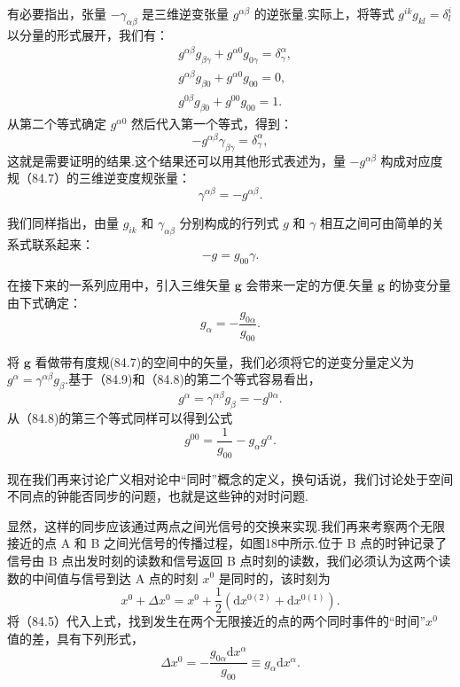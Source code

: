 有必要指出，张量 $-\gamma_{\alpha\beta}$ 是三维逆变张量 $g^{\alpha\beta}$ 的逆张量.实际上，将等式 $g^{ik}g_{kl}=\delta^i_l$ 以分量的形式展开，我们有：
\begin{equation}
\begin{aligned}
  &g^{\alpha\beta}g_{\beta\gamma}+g^{\alpha 0}g_{0\gamma}=\delta^{\alpha}_{\gamma},\\
  &g^{\alpha\beta}g_{\beta 0}+g^{\alpha 0}g_{00}=0,\\
  &g^{0\beta}g_{\beta 0}+g^{00}g_{00}=1.
\end{aligned}
\end{equation}
从第二个等式确定 $g^{\alpha 0}$ 然后代入第一个等式，得到：
\begin{equation*}
  -g^{\alpha\beta}\gamma_{\beta\gamma}=\delta^{\alpha}_{\gamma},
\end{equation*}
这就是需要证明的结果.这个结果还可以用其他形式表述为，量 $-g^{\alpha\beta}$ 构成对应度规（84.7）的三维逆变度规张量：
\begin{equation}
  \gamma^{\alpha\beta}=-g^{\alpha\beta}.
\end{equation}

我们同样指出，由量 $g_{ik}$ 和 $\gamma_{\alpha\beta}$ 分别构成的行列式 $g$ 和 $\gamma$ 相互之间可由简单的关系式联系起来：
\begin{equation}
  -g=g_{00}\gamma.
\end{equation}

在接下来的一系列应用中，引入三维矢量 $\boldsymbol{g}$ 会带来一定的方便.矢量 $\boldsymbol{g}$ 的协变分量由下式确定：
\begin{equation}
  g_{\alpha}=-\frac{g_{0\alpha}}{g_{00}}.
\end{equation}

将 $\boldsymbol{g}$ 看做带有度规(84.7)的空间中的矢量，我们必须将它的逆变分量定义为 $g^{\alpha}=\gamma^{\alpha\beta}g_{\beta}$.基于（84.9)和（84.8)的第二个等式容易看出，
\begin{equation}
  g^{\alpha}=\gamma^{\alpha\beta}g_{\beta}=-g^{0\alpha}.
\end{equation}
从（84.8)的第三个等式同样可以得到公式
\begin{equation}
  g^{00}=\frac{1}{g_{00}}-g_{\alpha}g^{\alpha}.
\end{equation}

现在我们再来讨论广义相对论中“同时”概念的定义，换句话说，我们讨论处于空间不同点的钟能否同步的问题，也就是这些钟的对时问题.

显然，这样的同步应该通过两点之间光信号的交换来实现.我们再来考察两个无限接近的点 A 和 B 之间光信号的传播过程，如图18中所示.位于 B 点的时钟记录了信号由 B 点出发时刻的读数和信号返回 B 点时刻的读数，我们必须认为这两个读数的中间值与信号到达 A 点的时刻 $x^0$ 是同时的，该时刻为
\begin{equation*}
  x^0+\Delta x^0=x^0+\frac{1}{2}\left(\mathrm{d}x^{0(2)}
  +\mathrm{d}x^{0(1)}\right).
\end{equation*}
将（84.5）代入上式，找到发生在两个无限接近的点的两个同时事件的“时间”$x^0$ 值的差，具有下列形式，
\begin{equation}
  \Delta x^0=-\frac{g_{0\alpha}\mathrm{d}x^{\alpha}}{g_{00}}
  \equiv g_{\alpha}\mathrm{d}x^{\alpha}.
\end{equation}

